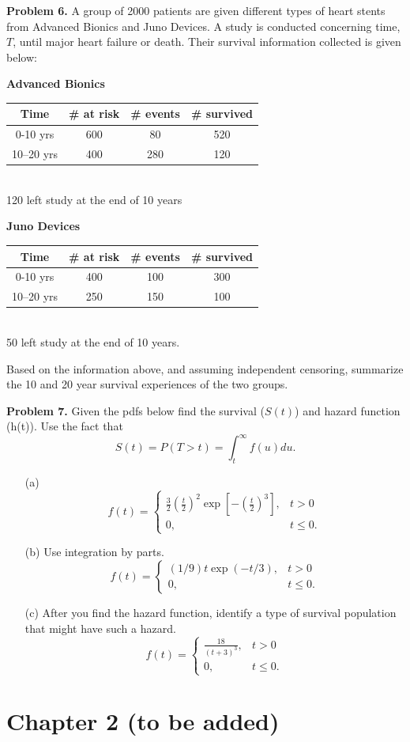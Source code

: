 \documentclass[12pt]{article}
\begin{document}
\textbf{Problem 6.}
A group of 2000 patients are given different types of heart stents from Advanced Bionics and Juno Devices. A study is conducted concerning time, $T$, until major heart failure or death. Their survival information collected is given below:
\begin{center}
\textbf{Advanced Bionics}
\begin{tabular}{ c c c c }
 Time & \# at risk & \# events & \# survived \\ \hline
 0-10 yrs & 600 & 80 & 520 \\
 10–20 yrs &  400 & 280 & 120
\end{tabular} \\
120 left study at the end of 10 years
\end{center}
\begin{center}
\textbf{Juno Devices}
\begin{tabular}{ c c c c }
 Time & \# at risk & \# events & \# survived \\ \hline
 0-10 yrs & 400 & 100 & 300 \\
 10–20 yrs &  250 & 150 & 100
\end{tabular} \\
50 left study at the end of 10 years.
\end{center}
Based on the information above, and assuming independent censoring, summarize the 10 and 20 year survival experiences of the two groups.

\newpage   
\textbf{Problem 7.}
Given the pdfs below find the survival ($S(t)$) and hazard function (h(t)). Use the fact that
\[
S(t) = P(T>t) = \int_t^{\infty} f(u) du.
\]

\begin{itemize}
	\item[(a)]
	$$
	f(t) = \begin{cases} \frac{3}{2} (\frac{t}{2})^2 \exp[-(\frac{t}{2})^3], &t > 0 \\
		0, &t \leq 0.
		\end{cases}
	$$
	\item[(b)] Use integration by parts.
	$$
	f(t) = \begin{cases} (1/9)t\exp(-t/3), &t > 0 \\
		0, &t \leq 0.
		\end{cases}
    $$
    \item[(c)] After you find the hazard function, identify a type of survival population that might have such a hazard.
    $$
	f(t) = \begin{cases} \frac{18}{(t+3)^3}, &t > 0 \\
		0, &t \leq 0.
		\end{cases}
    $$
\end{itemize}

\section{Chapter 2 (to be added)}
\end{document}

